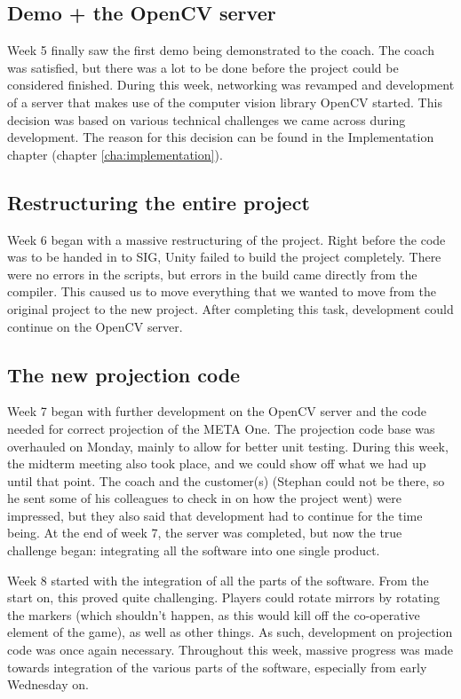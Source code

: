      \subsection{Demo + the OpenCV server} \label{ssec:firstdemo}
      Week 5 finally saw the first demo being demonstrated to the coach. The
      coach was satisfied, but there was a lot to be done before the project
      could be considered finished. During this week, networking was revamped
      and development of a server that makes use of the computer vision library
      OpenCV started. This decision was based on various technical challenges we 
      came across during development. The reason for this decision can be found 
      in the Implementation chapter (chapter \ref{cha:implementation}).
      
      \subsection{Restructuring the entire project}
      Week 6 began with a massive restructuring of the project. Right before
      the code was to be handed in to SIG, Unity failed to build the project
      completely. There were no errors in the scripts, but errors in the build
      came directly from the compiler. This caused us to move everything that
      we wanted to move from the original project to the new project. After
      completing this task, development could continue on the OpenCV server.
      
      \subsection{The new projection code}
      Week 7 began with further development on the OpenCV server and the code
      needed for correct projection of the META One. The projection code base
      was overhauled on Monday, mainly to allow for better unit testing. During
      this week, the midterm meeting also took place, and we could show off
      what we had up until that point. The coach and the customer(s) (Stephan
      could not be there, so he sent some of his colleagues to check in on
      how the project went) were impressed, but they also said that development
      had to continue for the time being. At the end of week 7, the server was
      completed, but now the true challenge began: integrating all the software
      into one single product.
      
      Week 8 started with the integration of all the parts of the software.
      From the start on, this proved quite challenging. Players could rotate
      mirrors by rotating the markers (which shouldn't happen, as this would
      kill off the co-operative element of the game), as well as other things.
      As such, development on projection code was once again necessary.
      Throughout this week, massive progress was made towards integration of 
      the various parts of the software, especially from early Wednesday on.
      
